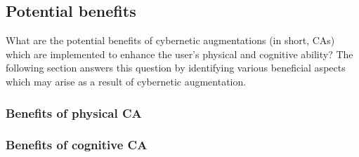 \subsection{Potential benefits}
What are the potential benefits of cybernetic augmentations (in short, CAs) which are implemented to enhance the user's physical and cognitive ability? The following section answers this question by identifying various beneficial aspects which may arise as a result of cybernetic augmentation.

\subsubsection{Benefits of physical CA}


\subsubsection{Benefits of cognitive CA}
